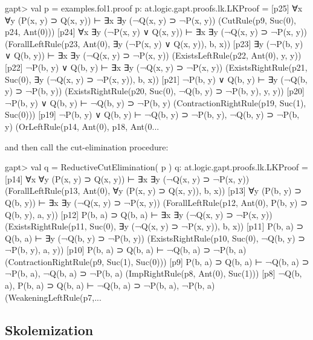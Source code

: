 \documentclass[a4paper,11pt]{article}
\begin{document}
\begin{clilisting}
gapt> val p = examples.fol1.proof
p: at.logic.gapt.proofs.lk.LKProof =
[p25] ∀x ∀y (P(x, y) ⊃ Q(x, y)) ⊢ ∃x ∃y (¬Q(x, y) ⊃ ¬P(x, y))    (CutRule(p9, Suc(0), p24, Ant(0)))
[p24] ∀x ∃y (¬P(x, y) ∨ Q(x, y)) ⊢ ∃x ∃y (¬Q(x, y) ⊃ ¬P(x, y))    (ForallLeftRule(p23, Ant(0), ∃y (¬P(x, y) ∨ Q(x, y)), b, x))
[p23] ∃y (¬P(b, y) ∨ Q(b, y)) ⊢ ∃x ∃y (¬Q(x, y) ⊃ ¬P(x, y))    (ExistsLeftRule(p22, Ant(0), y, y))
[p22] ¬P(b, y) ∨ Q(b, y) ⊢ ∃x ∃y (¬Q(x, y) ⊃ ¬P(x, y))    (ExistsRightRule(p21, Suc(0), ∃y (¬Q(x, y) ⊃ ¬P(x, y)), b, x))
[p21] ¬P(b, y) ∨ Q(b, y) ⊢ ∃y (¬Q(b, y) ⊃ ¬P(b, y))    (ExistsRightRule(p20, Suc(0), ¬Q(b, y) ⊃ ¬P(b, y), y, y))
[p20] ¬P(b, y) ∨ Q(b, y) ⊢ ¬Q(b, y) ⊃ ¬P(b, y)    (ContractionRightRule(p19, Suc(1), Suc(0)))
[p19] ¬P(b, y) ∨ Q(b, y) ⊢ ¬Q(b, y) ⊃ ¬P(b, y), ¬Q(b, y) ⊃ ¬P(b, y)    (OrLeftRule(p14, Ant(0), p18, Ant(0...

\end{clilisting}
%
and then call the cut-elimination procedure:
\begin{clilisting}
gapt> val q = ReductiveCutElimination( p )
q: at.logic.gapt.proofs.lk.LKProof =
[p14] ∀x ∀y (P(x, y) ⊃ Q(x, y)) ⊢ ∃x ∃y (¬Q(x, y) ⊃ ¬P(x, y))    (ForallLeftRule(p13, Ant(0), ∀y (P(x, y) ⊃ Q(x, y)), b, x))
[p13] ∀y (P(b, y) ⊃ Q(b, y)) ⊢ ∃x ∃y (¬Q(x, y) ⊃ ¬P(x, y))    (ForallLeftRule(p12, Ant(0), P(b, y) ⊃ Q(b, y), a, y))
[p12] P(b, a) ⊃ Q(b, a) ⊢ ∃x ∃y (¬Q(x, y) ⊃ ¬P(x, y))    (ExistsRightRule(p11, Suc(0), ∃y (¬Q(x, y) ⊃ ¬P(x, y)), b, x))
[p11] P(b, a) ⊃ Q(b, a) ⊢ ∃y (¬Q(b, y) ⊃ ¬P(b, y))    (ExistsRightRule(p10, Suc(0), ¬Q(b, y) ⊃ ¬P(b, y), a, y))
[p10] P(b, a) ⊃ Q(b, a) ⊢ ¬Q(b, a) ⊃ ¬P(b, a)    (ContractionRightRule(p9, Suc(1), Suc(0)))
[p9] P(b, a) ⊃ Q(b, a) ⊢ ¬Q(b, a) ⊃ ¬P(b, a), ¬Q(b, a) ⊃ ¬P(b, a)    (ImpRightRule(p8, Ant(0), Suc(1)))
[p8] ¬Q(b, a), P(b, a) ⊃ Q(b, a) ⊢ ¬Q(b, a) ⊃ ¬P(b, a), ¬P(b, a)    (WeakeningLeftRule(p7,...

\end{clilisting}


\subsection{Skolemization}
\end{document}
